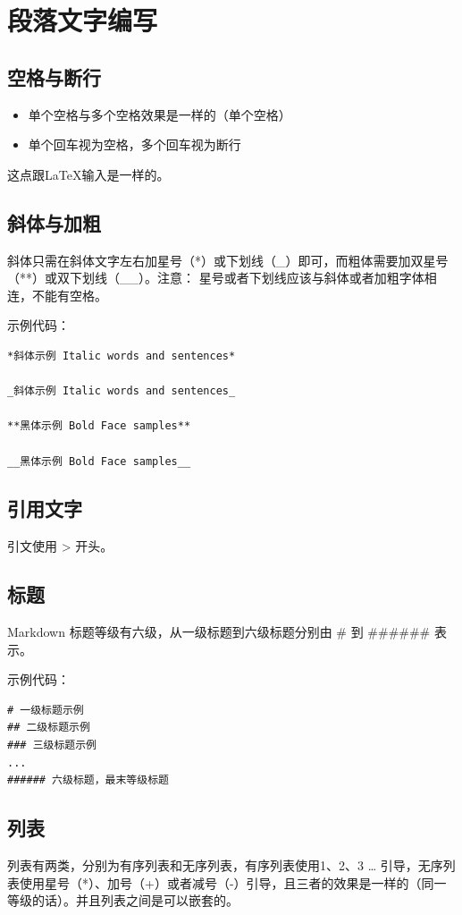 \section{段落文字编写}
\subsection{空格与断行}
\begin{itemize}
\item 单个空格与多个空格效果是一样的（单个空格）
\item 单个回车视为空格，多个回车视为断行
\end{itemize}
这点跟\LaTeX 输入是一样的。


\subsection{斜体与加粗}
斜体只需在斜体文字左右加星号（*）或下划线（\_）即可，而粗体需要加双星号（**）或双下划线（\_\_）。注意： 星号或者下划线应该与斜体或者加粗字体相连，不能有空格。

示例代码：
\begin{verbatim}
*斜体示例 Italic words and sentences*

_斜体示例 Italic words and sentences_

**黑体示例 Bold Face samples**

__黑体示例 Bold Face samples__
\end{verbatim}


\subsection{引用文字}
引文使用 > 开头。


\subsection{标题}
Markdown 标题等级有六级，从一级标题到六级标题分别由 \# 到 \#\#\#\#\#\# 表示。

示例代码：
\begin{verbatim}
# 一级标题示例
## 二级标题示例
### 三级标题示例
...
###### 六级标题，最末等级标题
\end{verbatim}


\subsection{列表}
列表有两类，分别为有序列表和无序列表，有序列表使用1、2、3 … 引导，无序列表使用星号（*）、加号（+）或者减号（-）引导，且三者的效果是一样的（同一等级的话）。并且列表之间是可以嵌套的。

